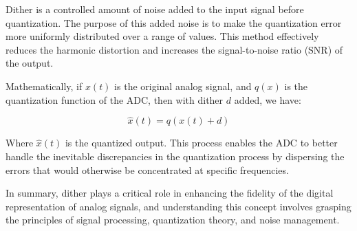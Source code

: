 Dither is a controlled amount of noise added to the input signal before quantization. The purpose of this added noise is to make the quantization error more uniformly distributed over a range of values. This method effectively reduces the harmonic distortion and increases the signal-to-noise ratio (SNR) of the output.

Mathematically, if \( x(t) \) is the original analog signal, and \( q(x) \) is the quantization function of the ADC, then with dither \( d \) added, we have:

\[
\hat{x}(t) = q(x(t) + d)
\]

Where \( \hat{x}(t) \) is the quantized output. This process enables the ADC to better handle the inevitable discrepancies in the quantization process by dispersing the errors that would otherwise be concentrated at specific frequencies.

In summary, dither plays a critical role in enhancing the fidelity of the digital representation of analog signals, and understanding this concept involves grasping the principles of signal processing, quantization theory, and noise management.

